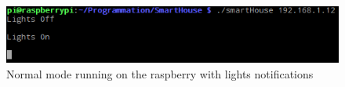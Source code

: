 \documentclass[10pt]{article}
\begin{document}
\begin{figure}[H]
  \centering
  \includegraphics[max width=\textwidth]{../imgs/normalMode.png}
  \caption{\label{normalMode}Normal mode running on the raspberry with lights notifications}
\end{figure}
\end{document}
